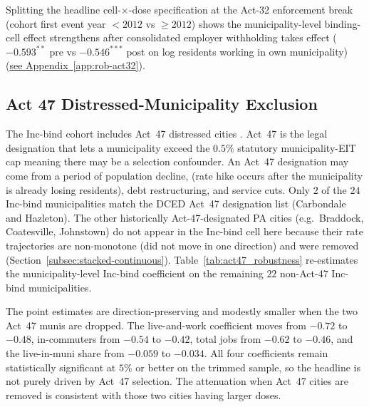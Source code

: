 \documentclass[12pt]{article}
\begin{document}
Splitting the headline cell-$\times$-dose specification at the Act-32
enforcement break (cohort first event year $<2012$ vs $\geq 2012$)
shows the municipality-level binding-cell effect strengthens after
consolidated employer withholding takes effect ($-0.593^{**}$ pre vs
$-0.546^{***}$ post on log residents working in own municipality)
(\hyperref[app:rob-act32]{see Appendix~\ref{app:rob-act32}}).

\subsection{Act 47 Distressed-Municipality Exclusion}
\label{subsec:rob-act47}

The Inc-bind cohort includes Act~47 distressed cities
\citep{paAct47_1987}. Act~47 is the legal designation that
lets a municipality exceed the $0.5\%$ statutory municipality-EIT
cap meaning there may be a selection confounder. An
Act~47 designation may come from a period of population
decline, (rate hike occurs after the municipality is
already losing residents), debt
restructuring, and service cuts. Only
$2$ of the $24$ Inc-bind municipalities match the DCED Act~47
designation list (Carbondale and Hazleton). The other historically
Act-47-designated PA cities (e.g.\ Braddock, Coatesville, Johnstown)
do not appear in the Inc-bind cell here because their rate trajectories are non-monotone (did not move in one direction) and were removed (Section~\ref{subsec:stacked-continuous}).
Table~\ref{tab:act47_robustness} re-estimates the
municipality-level Inc-bind coefficient on the remaining $22$
non-Act-47 Inc-bind municipalities.



The point estimates are direction-preserving and modestly smaller
when the two Act~47 munis are dropped. The live-and-work
coefficient moves from $-0.72$ to $-0.48$, in-commuters from
$-0.54$ to $-0.42$, total jobs from $-0.62$ to $-0.46$, and the
live-in-muni share from $-0.059$ to $-0.034$. All four coefficients
remain statistically significant at $5\%$ or better on the trimmed
sample, so the headline is not purely driven by Act~47 selection. The
attenuation when Act~47 cities are removed is consistent with those
two cities having larger doses.

\end{document}
